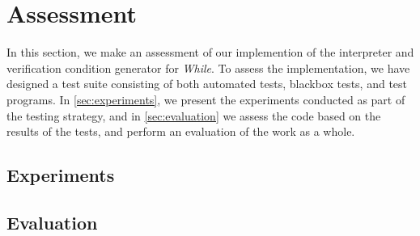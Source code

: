 \section{Assessment}\label{sec:assessment}
In this section, we make an assessment of our implemention of the interpreter and verification condition generator for \textit{While}. To assess the implementation, we have designed a test suite consisting of both automated tests, blackbox tests, and test programs.
In \autoref{sec:experiments}, we present the experiments conducted as part of the testing strategy, and in \autoref{sec:evaluation} we assess the code based on the results of the tests, and perform an evaluation of the work as a whole.

\subsection{Experiments}\label{sec:experiments}


\subsection{Evaluation}\label{sec:evaluation}

